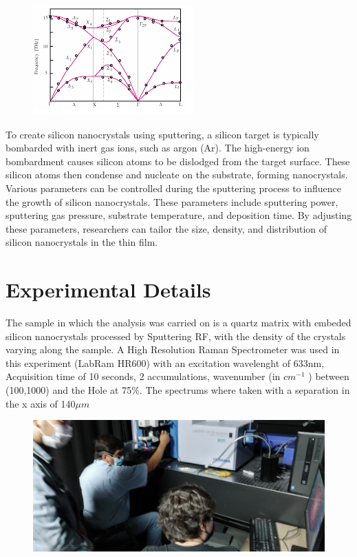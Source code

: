 \documentclass[a4paper,10pt,twocolumn]{article}
\begin{document}
\begin{figure}
  \centering
  \includegraphics[scale=0.9]{relacionesdedispersiondefonones.png}
\end{figure}

To create silicon nanocrystals using sputtering, a silicon target is typically bombarded with inert gas ions, such as argon (Ar). The high-energy ion bombardment causes silicon atoms to be dislodged from the target surface. These silicon atoms then condense and nucleate on the substrate, forming nanocrystals. Various parameters can be controlled during the sputtering process to influence the growth of silicon nanocrystals. These parameters include sputtering power, sputtering gas pressure, substrate temperature, and deposition time. By adjusting these parameters, researchers can tailor the size, density, and distribution of silicon nanocrystals in the thin film.


\section{Experimental Details}
The sample in which the analysis was carried on is a quartz matrix with embeded silicon nanocrystals processed by Sputtering RF, with the density of the crystals varying along the sample. A High Resolution Raman Spectrometer was used in this experiment (LabRam HR600) with an excitation wavelenght
of 633nm, Acquisition time of 10 seconds, 2 accumulations, wavenumber (in $cm^{-1}$ ) between (100,1000) and the Hole at 75\%. The spectrums where taken with a separation in the x axis of 140$\mu m$

\begin{figure}[h]
  \centering
  \includegraphics[scale=.055]{raman.jpg}
\end{figure}
\end{document}
